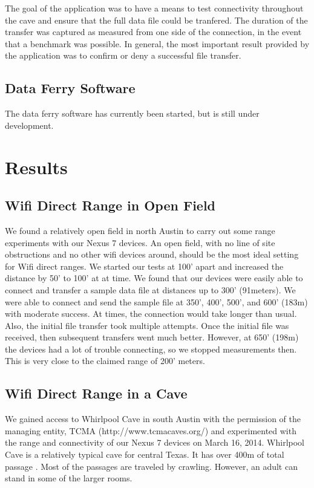 \documentclass[10pt,twocolumn]{article}
\begin{document}
The goal of the application was to have a means to test connectivity throughout the cave and ensure that the full data file could be tranfered.
The duration of the transfer was captured as measured from one side of the connection, in the event that a benchmark was possible.
In general, the most important result provided by the application was to confirm or deny a successful file transfer.

\subsection{Data Ferry Software}
The data ferry software has currently been started, but is still under development.

\section{Results}

\subsection{Wifi Direct Range in Open Field}

We found a relatively open field in north Austin to carry out some range experiments with our Nexus 7 devices.
An open field, with no line of site obstructions and no other wifi devices around, should be the most ideal setting for Wifi direct ranges.
We started our tests at 100' apart and increased the distance by 50' to 100' at at time.
We found that our devices were easily able to connect and transfer a sample data file at distances up to 300' (91meters). 
We were able to connect and send the sample file at 350', 400', 500', and 600' (183m) with moderate success. 
At times, the connection would take longer than usual.
Also, the initial file transfer took multiple attempts.
Once the initial file was received, then subsequent transfers went much better.
However, at 650' (198m) the devices had a lot of trouble connecting, so we stopped measurements then.
This is very close to the claimed range of 200' meters.

\subsection{Wifi Direct Range in a Cave}
We gained access to Whirlpool Cave in south Austin with the permission of the managing entity, TCMA (http://www.tcmacaves.org/) and experimented with the range and connectivity of our Nexus 7 devices on March 16, 2014.
Whirlpool Cave is a relatively typical cave for central Texas.
It has over 400m of total passage \cite{whirlpool}. 
Most of the passages are traveled by crawling.
However, an adult can stand in some of the larger rooms.
\end{document}
